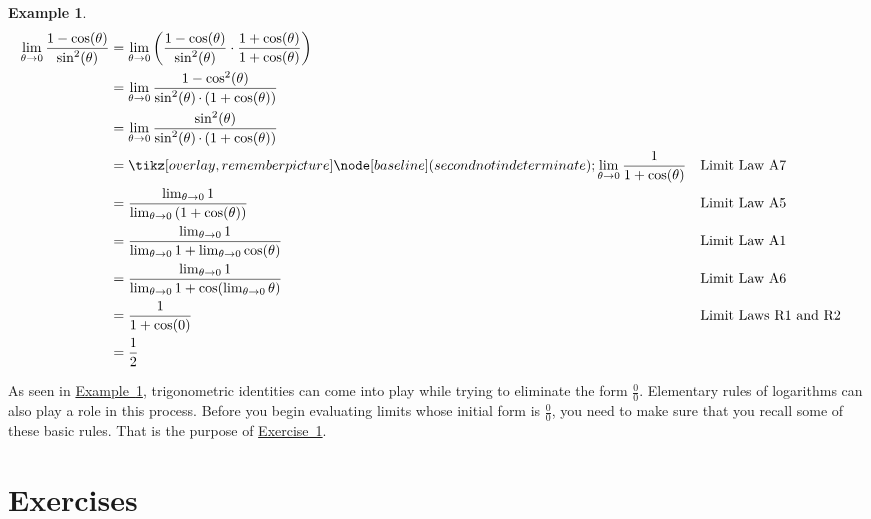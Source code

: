 \documentclass[12pt,]{book}
\theoremstyle{plain}
\theoremstyle{definition}
\newtheorem{example}[theorem]{Example}
\numberwithin{equation}{section}
\newcommand{\tikzmark}[1]{\tikz[overlay,remember picture] \node[baseline] (#1) {};}%
\newcommand{\fe}[2]{\mathop{{#1}{\left(#2\right)}}}
\begin{document}
\begin{example}\label{example-second-indeterminate}
\begin{align*}
\lim_{\theta\to0}\frac{1-\fe{\cos}{\theta}}{\fe{\sin^2}{\theta}}&=\lim_{\theta\to0}\left(\frac{1-\fe{\cos}{\theta}}{\fe{\sin^2}{\theta}}\cdot\frac{1+\fe{\cos}{\theta}}{1+\fe{\cos}{\theta}}\right)\\
&=\lim_{\theta\to0}\frac{1-\fe{\cos^2}{\theta}}{\fe{\sin^2}{\theta}\cdot\left(1+\fe{\cos}{\theta}\right)}\\
&=\lim_{\theta\to0}\frac{\fe{\sin^2}{\theta}}{\fe{\sin^2}{\theta}\cdot\left(1+\fe{\cos}{\theta}\right)}\\
&=\tikzmark{second not indeterminate}\lim_{\theta\to0}\frac{1}{1+\fe{\cos}{\theta}}&&\text{Limit Law A7}\\
&=\frac{\lim_{\theta\to0}1}{\lim_{\theta\to0}\left(1+\fe{\cos}{\theta}\right)}&&\text{Limit Law A5}\\
&=\frac{\lim_{\theta\to0}1}{\lim_{\theta\to0}1+\lim_{\theta\to0}\fe{\cos}{\theta}}&&\text{Limit Law A1}\\
&=\frac{\lim_{\theta\to0}1}{\lim_{\theta\to0}1+\fe{\cos}{\lim_{\theta\to0}\theta}}&&\text{Limit Law A6}\\
&=\frac{1}{1+\fe{\cos}{0}}&&\text{Limit Laws R1 and R2}\\
&=\frac{1}{2}
\end{align*}%
\end{example}
\par
As seen in \hyperref[example-second-indeterminate]{Example~\ref*{example-second-indeterminate}}, trigonometric identities can come into play while trying to eliminate the form \(\frac{0}{0}\). Elementary rules of logarithms can also play a role in this process. Before you begin evaluating limits whose initial form is \(\frac{0}{0}\), you need to make sure that you recall some of these basic rules. That is the purpose of \hyperref[exercise-identities-review]{Exercise~1}.%
\typeout{************************************************}
\typeout{************************************************}
\section*{Exercises}\label{exercises-6}
\end{document}
